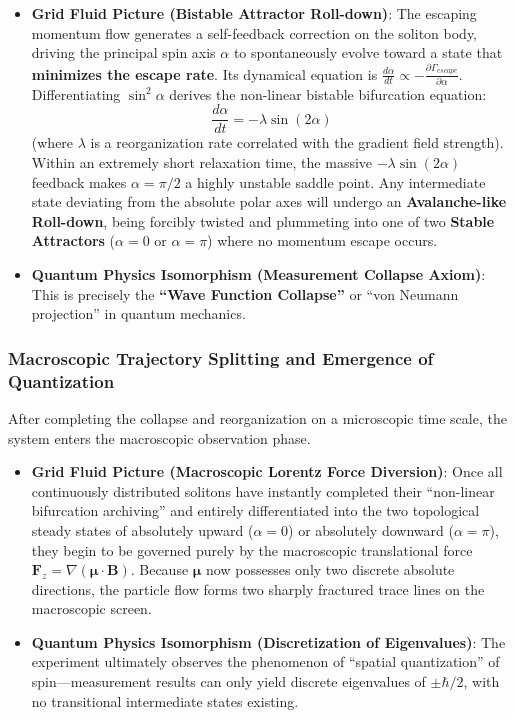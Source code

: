 \documentclass[12pt, a4paper]{article}
\begin{document}
\begin{itemize}
    \item \textbf{Grid Fluid Picture (Bistable Attractor Roll-down)}: The escaping momentum flow generates a self-feedback correction on the soliton body, driving the principal spin axis $\alpha$ to spontaneously evolve toward a state that \textbf{minimizes the escape rate}. Its dynamical equation is $\frac{d\alpha}{dt} \propto - \frac{\partial \Gamma_{escape}}{\partial \alpha}$. 
    Differentiating $\sin^2\alpha$ derives the non-linear bistable bifurcation equation:
    \begin{equation}
        \frac{d\alpha}{dt} = - \lambda \sin(2\alpha)
    \end{equation}
    (where $\lambda$ is a reorganization rate correlated with the gradient field strength). \\
    Within an extremely short relaxation time, the massive $-\lambda \sin(2\alpha)$ feedback makes $\alpha = \pi/2$ a highly unstable saddle point. Any intermediate state deviating from the absolute polar axes will undergo an \textbf{Avalanche-like Roll-down}, being forcibly twisted and plummeting into one of two \textbf{Stable Attractors} ($\alpha = 0$ or $\alpha = \pi$) where no momentum escape occurs.
    \item \textbf{Quantum Physics Isomorphism (Measurement Collapse Axiom)}: This is precisely the \textbf{``Wave Function Collapse''} or ``von Neumann projection'' in quantum mechanics.
\end{itemize}

\subsubsection{Macroscopic Trajectory Splitting and Emergence of Quantization}

After completing the collapse and reorganization on a microscopic time scale, the system enters the macroscopic observation phase.

\begin{itemize}
    \item \textbf{Grid Fluid Picture (Macroscopic Lorentz Force Diversion)}: Once all continuously distributed solitons have instantly completed their ``non-linear bifurcation archiving'' and entirely differentiated into the two topological steady states of absolutely upward ($\alpha=0$) or absolutely downward ($\alpha=\pi$), they begin to be governed purely by the macroscopic translational force $\mathbf{F}_z = \nabla (\boldsymbol{\mu} \cdot \mathbf{B})$. Because $\boldsymbol{\mu}$ now possesses only two discrete absolute directions, the particle flow forms two sharply fractured trace lines on the macroscopic screen.
    \item \textbf{Quantum Physics Isomorphism (Discretization of Eigenvalues)}: The experiment ultimately observes the phenomenon of ``spatial quantization'' of spin—measurement results can only yield discrete eigenvalues of $\pm \hbar/2$, with no transitional intermediate states existing.
\end{itemize}
\end{document}
